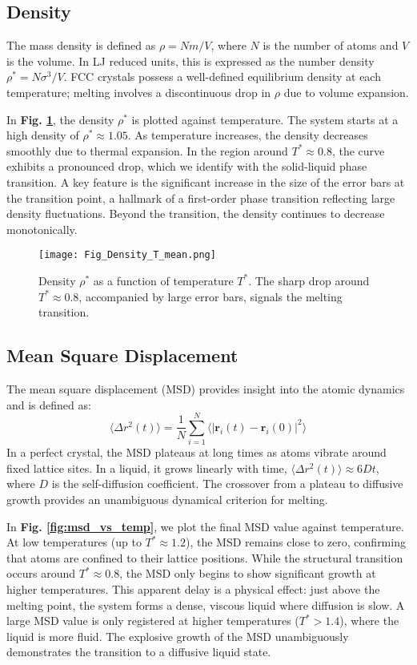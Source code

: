 \documentclass{article}
\begin{document}
\subsection{Density}

The mass density is defined as $\rho = Nm/V$, where $N$ is the number of atoms and $V$ is the volume. In LJ reduced units, this is expressed as the number density $\rho^* = N\sigma^3/V$. FCC crystals possess a well-defined equilibrium density at each temperature; melting involves a discontinuous drop in $\rho$ due to volume expansion. 

In \textbf{Fig. \ref{fig:density_vs_temp}}, the density $\rho^*$ is plotted against temperature. The system starts at a high density of $\rho^* \approx 1.05$. As temperature increases, the density decreases smoothly due to thermal expansion. In the region around $T^* \approx 0.8$, the curve exhibits a pronounced drop, which we identify with the solid-liquid phase transition. A key feature is the significant increase in the size of the error bars at the transition point, a hallmark of a first-order phase transition reflecting large density fluctuations. Beyond the transition, the density continues to decrease monotonically.

\begin{figure}[h!]
    \centering
    \texttt{[image: Fig\_Density\_T\_mean.png]}
    \caption{Density $\rho^*$ as a function of temperature $T^*$. The sharp drop around $T^* \approx 0.8$, accompanied by large error bars, signals the melting transition.}
    \label{fig:density_vs_temp}
\end{figure}

\subsection{Mean Square Displacement}

The mean square displacement (MSD) provides insight into the atomic dynamics and is defined as:
$$
\langle\Delta r^2(t)\rangle = \frac{1}{N}\sum_{i=1}^N \langle|\mathbf{r}_i(t) - \mathbf{r}_i(0)|^2\rangle
$$
In a perfect crystal, the MSD plateaus at long times as atoms vibrate around fixed lattice sites. In a liquid, it grows linearly with time, $\langle\Delta r^2(t)\rangle \approx 6Dt$, where $D$ is the self-diffusion coefficient. The crossover from a plateau to diffusive growth provides an unambiguous dynamical criterion for melting.

In \textbf{Fig. \ref{fig:msd_vs_temp}}, we plot the final MSD value against temperature. At low temperatures (up to $T^* \approx 1.2$), the MSD remains close to zero, confirming that atoms are confined to their lattice positions. While the structural transition occurs around $T^* \approx 0.8$, the MSD only begins to show significant growth at higher temperatures. This apparent delay is a physical effect: just above the melting point, the system forms a dense, viscous liquid where diffusion is slow. A large MSD value is only registered at higher temperatures ($T^* > 1.4$), where the liquid is more fluid. The explosive growth of the MSD unambiguously demonstrates the transition to a diffusive liquid state.
\end{document}
